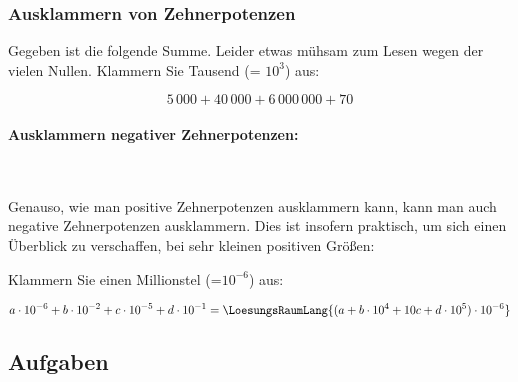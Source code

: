 

\newpage


\subsubsection{Ausklammern von Zehnerpotenzen}
Gegeben ist die folgende Summe. Leider etwas mühsam zum Lesen wegen der vielen Nullen. Klammern Sie Tausend (= $10^3$) aus:

$$5\,000 + 40\,000 + 6\,000\,000 + 70$$


\paragraph{Ausklammern negativer Zehnerpotenzen:}
\,

\vspace{1mm}

Genauso, wie man positive Zehnerpotenzen ausklammern kann, kann man auch negative Zehnerpotenzen ausklammern. Dies ist insofern praktisch, um sich einen Überblick zu verschaffen, bei sehr kleinen positiven Größen:

Klammern Sie einen Millionstel (=$10^{-6}$) aus:


$$a\cdot{}10^{-6} + b\cdot{}10^{-2} + c\cdot{}10^{-5} +
d\cdot{}10^{-1} = \LoesungsRaumLang{(a + b\cdot{}10^4 + 10c +
  d\cdot{}10^{5}) \cdot{} 10^{-6}}$$

\subsection*{Aufgaben}


\newpage
